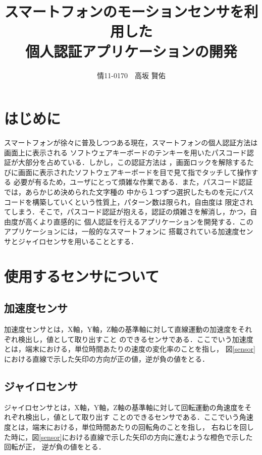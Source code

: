 \documentclass[11pt]{jreport}
\title{\bfseries スマートフォンのモーションセンサを利用した\\個人認証アプリケーションの開発}
\author{情11-0170　高坂 賢佑}
\date{}
\begin{document}
\maketitle

\tableofcontents
\listoffigures

\chapter*{はじめに}
スマートフォンが徐々に普及しつつある現在，スマートフォンの個人認証方法は画面上に表示される
ソフトウェアキーボードのテンキーを用いたパスコード認証が大部分を占めている．しかし，この認証方法は
，画面ロックを解除するたびに画面に表示されたソフトウェアキーボードを目で見て指でタッチして操作する
必要が有るため，ユーザにとって煩雑な作業である．また，パスコード認証では，あらかじめ決められた文字種の
中から１つずつ選択したものを元にパスコードを構築していくという性質上，パターン数は限られ，自由度は
限定されてしまう．そこで，パスコード認証が抱える，認証の煩雑さを解消し，かつ，自由度が高くより直感的に
個人認証を行えるアプリケーションを開発する．このアプリケーションには，一般的なスマートフォンに
搭載されている加速度センサとジャイロセンサを用いることとする．

\chapter{使用するセンサについて}
	\section{加速度センサ}
	加速度センサとは，X軸，Y軸，Z軸の基準軸に対して直線運動の加速度をそれぞれ検出し，値として取り出すこと
	のできるセンサである．ここでいう加速度とは，端末における，単位時間あたりの速度の変化率のことを指し，
	図\ref{sensor}における直線で示した矢印の方向が正の値，逆が負の値をとる．
	
	\section{ジャイロセンサ}
	ジャイロセンサとは，X軸，Y軸，Z軸の基準軸に対して回転運動の角速度をそれぞれ検出し，値として取り出す
	ことのできるセンサである．ここでいう角速度とは，端末における，単位時間あたりの回転角のことを指し，
	右ねじを回した時に，図\ref{sensor}における直線で示した矢印の方向に進むような橙色で示した回転が正，
    逆が負の値をとる．
\end{document}
